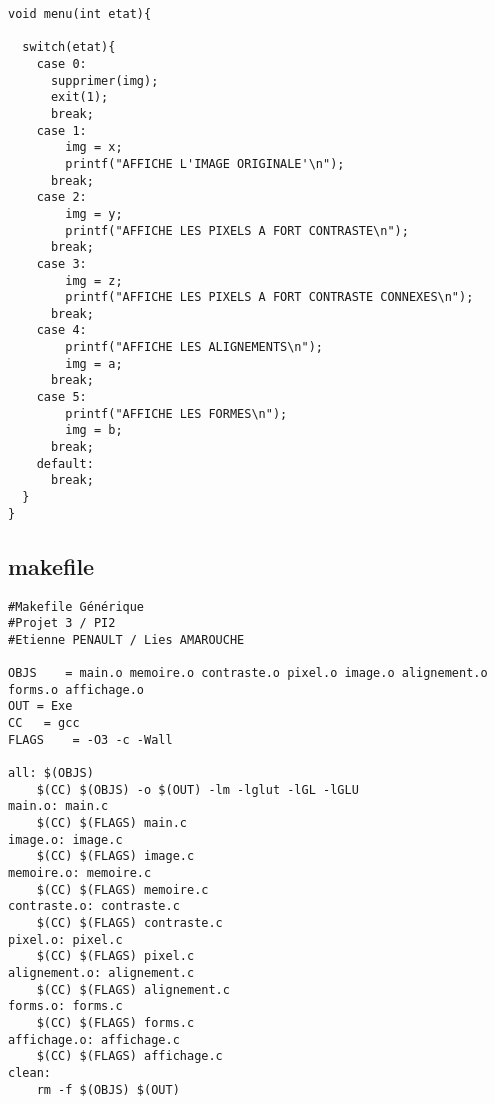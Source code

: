 \documentclass[a4paper , 10pt]{article}
\begin{document}
\begin{verbatim}
void menu(int etat){
  
  switch(etat){
    case 0:
      supprimer(img);
      exit(1);
      break;
    case 1:
        img = x;
        printf("AFFICHE L'IMAGE ORIGINALE'\n");
      break;
    case 2:
        img = y;
        printf("AFFICHE LES PIXELS A FORT CONTRASTE\n");
      break;
    case 3:
        img = z;
        printf("AFFICHE LES PIXELS A FORT CONTRASTE CONNEXES\n");
      break;
    case 4:
        printf("AFFICHE LES ALIGNEMENTS\n");
        img = a;
      break;
    case 5:
    	printf("AFFICHE LES FORMES\n");
    	img = b;
      break;
    default:
      break;
  }
}
\end{verbatim}

\subsection{makefile}
\begin{verbatim}
#Makefile Générique
#Projet 3 / PI2
#Etienne PENAULT / Lies AMAROUCHE

OBJS	= main.o memoire.o contraste.o pixel.o image.o alignement.o forms.o affichage.o
OUT	= Exe
CC	 = gcc
FLAGS	 = -O3 -c -Wall

all: $(OBJS)
	$(CC) $(OBJS) -o $(OUT) -lm -lglut -lGL -lGLU
main.o: main.c
	$(CC) $(FLAGS) main.c 
image.o: image.c
	$(CC) $(FLAGS) image.c
memoire.o: memoire.c
	$(CC) $(FLAGS) memoire.c
contraste.o: contraste.c
	$(CC) $(FLAGS) contraste.c
pixel.o: pixel.c
	$(CC) $(FLAGS) pixel.c
alignement.o: alignement.c
	$(CC) $(FLAGS) alignement.c
forms.o: forms.c
	$(CC) $(FLAGS) forms.c
affichage.o: affichage.c
	$(CC) $(FLAGS) affichage.c
clean:
	rm -f $(OBJS) $(OUT)

\end{verbatim}
\end{document}
